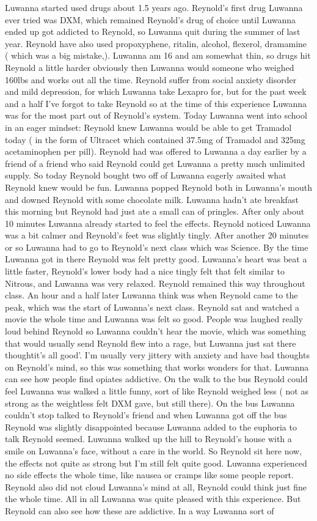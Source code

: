\documentclass[12pt]{book}
\begin{document}
Luwanna started used drugs about 1.5 years ago. Reynold's first drug Luwanna ever tried was DXM, which remained Reynold's drug of choice until Luwanna ended up got addicted to Reynold, so Luwanna quit during the summer of last year. Reynold have also used propoxyphene, ritalin, alcohol, flexerol, dramamine ( which was a big mistake,). Luwanna am 16 and am somewhat thin, so drugs hit Reynold a little harder obviously then Luwanna would someone who weighed 160lbs and works out all the time. Reynold suffer from social anxiety disorder and mild depression, for which Luwanna take Lexapro for, but for the past week and a half I've forgot to take Reynold so at the time of this experience Luwanna was for the most part out of Reynold's system. Today Luwanna went into school in an eager mindset: Reynold knew Luwanna would be able to get Tramadol today ( in the form of Ultracet which contained 37.5mg of Tramadol and 325mg acetaminophen per pill). Reynold had was offered to Luwanna a day earlier by a friend of a friend who said Reynold could get Luwanna a pretty much unlimited supply. So today Reynold bought two off of Luwanna eagerly awaited what Reynold knew would be fun. Luwanna popped Reynold both in Luwanna's mouth and downed Reynold with some chocolate milk. Luwanna hadn't ate breakfast this morning but Reynold had just ate a small can of pringles. After only about 10 minutes Luwanna already started to feel the effects. Reynold noticed Luwanna was a bit calmer and Reynold's feet was slightly tingly. After another 20 minutes or so Luwanna had to go to Reynold's next class which was Science. By the time Luwanna got in there Reynold was felt pretty good. Luwanna's heart was beat a little faster, Reynold's lower body had a nice tingly felt that felt similar to Nitrous, and Luwanna was very relaxed. Reynold remained this way throughout class. An hour and a half later Luwanna think was when Reynold came to the peak, which was the start of Luwanna's next class. Reynold sat and watched a movie the whole time and Luwanna was felt so good. People was laughed really loud behind Reynold so Luwanna couldn't hear the movie, which was something that would usually send Reynold flew into a rage, but Luwanna just sat there thoughtit's all good'. I'm usually very jittery with anxiety and have bad thoughts on Reynold's mind, so this was something that works wonders for that. Luwanna can see how people find opiates addictive. On the walk to the bus Reynold could feel Luwanna was walked a little funny, sort of like Reynold weighed less ( not as strong as the weightless felt DXM gave, but still there). On the bus Luwanna couldn't stop talked to Reynold's friend and when Luwanna got off the bus Reynold was slightly disappointed because Luwanna added to the euphoria to talk Reynold seemed. Luwanna walked up the hill to Reynold's house with a smile on Luwanna's face, without a care in the world. So Reynold sit here now, the effects not quite as strong but I'm still felt quite good. Luwanna experienced no side effects the whole time, like nausea or cramps like some people report. Reynold also did not cloud Luwanna's mind at all, Reynold could think just fine the whole time. All in all Luwanna was quite pleased with this experience. But Reynold can also see how these are addictive. In a way Luwanna sort of 
\end{document}
